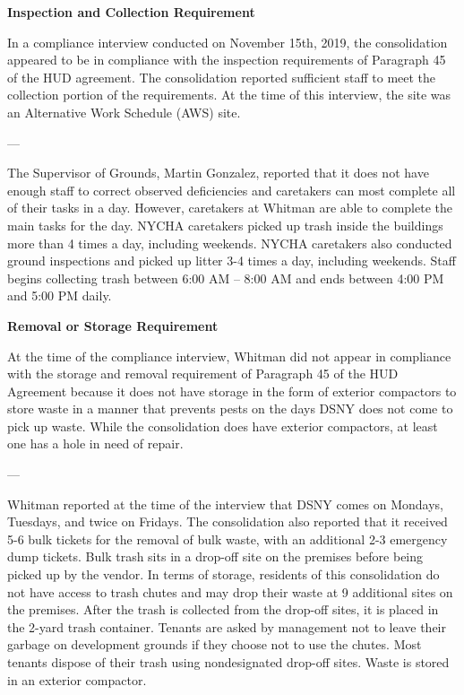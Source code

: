 

\textbf{Inspection and Collection Requirement}

In a compliance interview conducted on November 15th, 2019, the consolidation appeared to be in compliance with the inspection requirements of Paragraph 45 of the HUD agreement. The consolidation reported sufficient staff to meet the collection portion of the requirements. At the time of this interview, the site was an Alternative Work Schedule (AWS) site. 

---

The Supervisor of Grounds, Martin Gonzalez, reported that it does not have enough staff to correct observed deficiencies and caretakers can most complete all of their tasks in a day. However, caretakers at Whitman are able to complete the main tasks for the day. NYCHA caretakers picked up trash inside the buildings more than 4 times a day, including weekends. NYCHA caretakers also conducted ground inspections and picked up litter 3-4 times a day, including weekends. Staff begins collecting trash between 6:00 AM -- 8:00 AM and ends between 4:00 PM and 5:00 PM daily.

\textbf{Removal or Storage Requirement}

At the time of the compliance interview, Whitman did not appear in compliance with the storage and removal requirement of Paragraph 45 of the HUD Agreement because it does not have storage in the form of exterior compactors to store waste in a manner that prevents pests on the days DSNY does not come to pick up waste. While the consolidation does have exterior compactors, at least one has a hole in need of repair. 

---

Whitman reported at the time of the interview that DSNY comes on Mondays, Tuesdays, and twice on Fridays. The consolidation also reported that it received 5-6 bulk tickets for the removal of bulk waste, with an additional 2-3 emergency dump tickets. Bulk trash sits in a drop-off site on the premises before being picked up by the vendor. In terms of storage, residents of this consolidation do not have access to trash chutes and may drop their waste at 9 additional sites on the premises. After the trash is collected from the drop-off sites, it is placed in the 2-yard trash container. Tenants are asked by management not to leave their garbage on development grounds if they choose not to use the chutes. Most tenants dispose of their trash using nondesignated drop-off sites. Waste is stored in an exterior compactor. 

